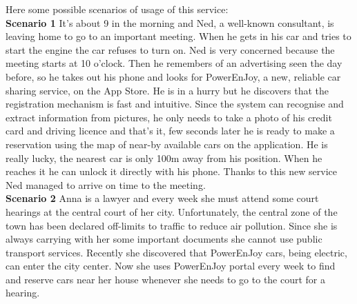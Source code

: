 Here some possible scenarios of usage of this service:\\
\bigbreak
\bigbreak
\textbf{\large Scenario 1}
\bigbreak
It's about 9 in the morning and Ned, a well-known consultant, is leaving home to go to an important meeting. When he gets in his car and tries to start the engine the car refuses to turn on. Ned is very concerned because the meeting starts at 10 o'clock. Then he remembers of an advertising seen the day before, so he takes out his phone and looks for PowerEnJoy, a new, reliable car sharing service, on the App Store. He is in a hurry but he discovers that the registration mechanism is fast and intuitive. Since the system can recognise and extract information from pictures, he only needs to take a photo of his credit card and driving licence and that's it, few seconds later he is ready to make a reservation using the map of near-by available cars on the application. He is really lucky, the nearest car is only 100m away from his position. When he reaches it he can unlock it directly with his phone. Thanks to this new service Ned managed to arrive on time to the meeting.\\
\bigbreak
\bigbreak
\textbf{\large Scenario 2}
\bigbreak
Anna is a lawyer and every week she must attend some court hearings at the central court of her city. Unfortunately, the central zone of the town has been declared off-limits to traffic to reduce air pollution. Since she is always carrying with her some important documents she cannot use public transport services. Recently she discovered that PowerEnJoy cars, being electric, can enter the city center. Now she uses PowerEnJoy portal every week to find and reserve cars near her house whenever she needs to go to the court for a hearing. 